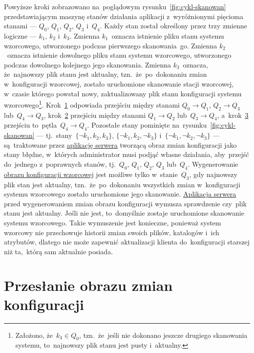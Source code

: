 \documentclass[thesis]{subfiles}
\begin{document}
Powyższe kroki zobrazowano na~poglądowym rysunku~\ref{fig:cykl-skanowan} przedstawiającym maszynę stanów działania aplikacji z~wyróżnionymi pięcioma stanami --- $Q_0$, $Q_1$, $Q_2$, $Q_3$ i~$Q_4$. Każdy stan został określony przez trzy zmienne logiczne --- $k_1$, $k_2$ i~$k_3$. Zmienna $k_1$~oznacza istnienie pliku stanu systemu wzorcowego, utworzonego podczas pierwszego skanowania~go. Zmienna $k_2$~oznacza istnienie dowolnego pliku stanu systemu wzorcowego, utworzonego podczas dowolnego kolejnego jego skanowania. Zmienna $k_3$~oznacza, że~najnowszy plik stanu jest aktualny, tzn.~że~po~dokonaniu zmian w~konfiguracji wzorcowej, zostało uruchomione skanowanie stacji wzorcowej, w~czasie którego powstał nowy, zaktualizowany plik stanu konfiguracji systemu wzorcowego\footnote{Założono, że~$k_3\in Q_0$, tzn.~że~jeśli nie dokonano jeszcze drugiego skanowania systemu, to~najnowszy plik stanu jest pusty i~aktualny.}. Krok~\hyperlink{itm:pierwsze-skanowanie}{1} odpowiada przejściu między stanami $Q_0\rightarrow Q_1$, $Q_2\rightarrow Q_3$ lub~$Q_4\rightarrow Q_3$, krok~\hyperlink{itm:dokonanie-zmian}{2} przejściu między stanami $Q_1\rightarrow Q_2$ lub~$Q_3\rightarrow Q_4$, a~krok~\hyperlink{itm:dokonanie-zmian}{3} przejściu to~pętla~$Q_4\rightarrow Q_4$. Pozostałe stany pominięte na~rysunku~\ref{fig:cykl-skanowan} --- tj.~stany~$\{\neg k_1,k_2,k_3\}$, $\{\neg k_1,k_2,\neg k_3\}$ i~$\{\neg k_1,\neg k_2,\neg k_3\}$ --- są~traktowane przez \hyperref[sec:srv-app]{aplikację serwera} tworzącą obraz zmian konfiguracji jako stany błędne, w~których administrator musi podjąć własne działania, aby~przejść do~jednego z~poprawnych stanów, tj.~$Q_0$, $Q_1$, $Q_2$, $Q_3$ lub~$Q_4$. Wygenerowanie \hyperref[sec:obraz-zmian-konfiguracji]{obrazu konfiguracji wzorcowej} jest możliwe tylko w~stanie~$Q_3$, gdy najnowszy plik stan jest aktualny, tzn.~że~po~dokonaniu wszystkich zmian w~konfiguracji systemu wzorcowego zostało uruchomione jego skanowanie. \hyperref[sec:srv-app]{Aplikacja serwera} przed wygenerowaniem zmian obrazu konfiguracji wymusza sprawdzenie czy~plik stanu jest aktualny. Jeśli nie jest, to~domyślnie zostaje uruchomione skanowanie systemu wzorcowego. Takie wymuszenie jest konieczne, ponieważ system wzorcowy nie przechowuje historii zmian swoich plików, katalogów i~ich atrybutów, dlatego nie może zapewnić aktualizacji klienta do~konfiguracji starszej niż ta,~którą sam aktualnie posiada.


\section{Przesłanie obrazu zmian konfiguracji}
\label{sec:przeslanie-obrazu-konfiguracji}
\end{document}

